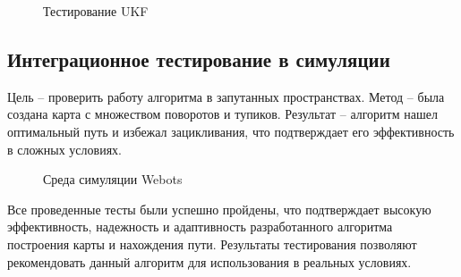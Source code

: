 \FloatBarrier
\begin{figure}[h]
\centering
\caption{Тестирование UKF}
\end{figure}
\FloatBarrier

\subsection{Интеграционное тестирование в симуляции}


Цель -- проверить работу алгоритма в запутанных пространствах.
Метод -- была создана карта с множеством поворотов и тупиков.
Результат -- алгоритм нашел оптимальный путь и избежал зацикливания, что
подтверждает его эффективность в сложных условиях.

\FloatBarrier
\begin{figure}[h]
\centering
\caption{Среда симуляции Webots}
\end{figure}
\FloatBarrier


Все проведенные тесты были успешно пройдены, что подтверждает высокую
эффективность, надежность и адаптивность разработанного алгоритма построения
карты и нахождения пути. Результаты тестирования позволяют рекомендовать данный
алгоритм для использования в реальных условиях.


